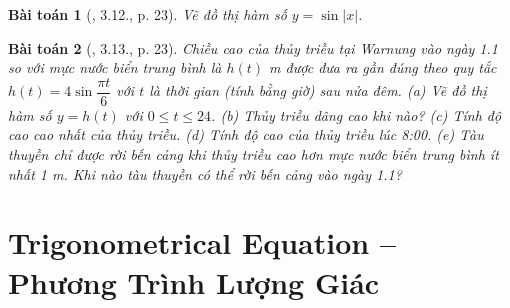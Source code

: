 \documentclass{article}
\newtheorem{baitoan}{Bài toán}
\begin{document}
\begin{baitoan}[\cite{Hung_nang_cao_phat_trien_Toan_11_tap_1}, 3.12., p. 23]
	Vẽ đồ thị hàm số $y = \sin|x|$.
\end{baitoan}

\begin{baitoan}[\cite{Hung_nang_cao_phat_trien_Toan_11_tap_1}, 3.13., p. 23]
	Chiều cao của thủy triều tại Warnung vào ngày {\rm1.1} so với mực nước biển trung bình là $h(t)$ {\rm m} được đưa ra gần đúng theo quy tắc $h(t) = 4\sin\dfrac{\pi t}{6}$ với $t$ là thời gian (tính bằng giờ) sau nửa đêm. (a) Vẽ đồ thị hàm số $y = h(t)$ với $0\le t\le24$. (b) Thủy triều dâng cao khi nào? (c) Tính độ cao cao nhất của thủy triều. (d) Tính độ cao của thủy triều lúc {\rm8:00}. (e) Tàu thuyền chỉ được rời bến cảng khi thủy triều cao hơn mực nước biển trung bình ít nhất {\rm1 m}. Khi nào tàu thuyền có thể rời bến cảng vào ngày {\rm1.1}?
\end{baitoan}


\section{Trigonometrical Equation -- Phương Trình Lượng Giác}


\printbibliography[heading=bibintoc]
	
\end{document}
